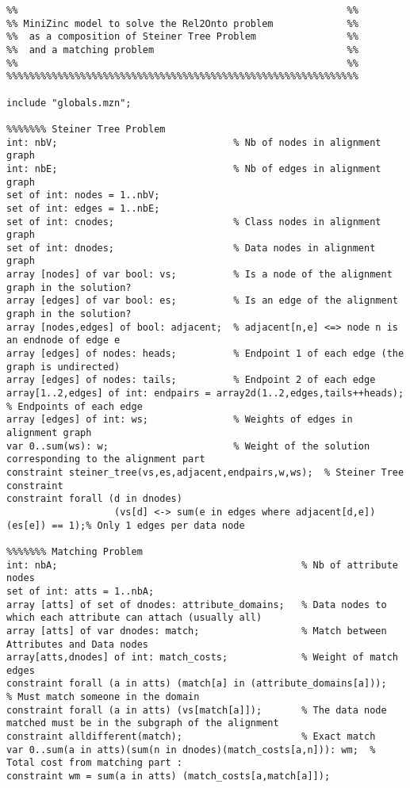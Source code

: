 \documentclass[letterpaper]{article} %
\newcommand{\minizinc}{\textsc{MiniZinc}}
\begin{document}
\begin{minipage}{\textwidth}
	\begin{lstlisting}[caption={\minizinc{} model (part 1 of 2)},captionpos=b]
%%%%%%%%%%%%%%%%%%%%%%%%%%%%%%%%%%%%%%%%%%%%%%%%%%%%%%%%%%%%%%
%%                                                          %%
%% MiniZinc model to solve the Rel2Onto problem             %%
%%  as a composition of Steiner Tree Problem                %%
%%  and a matching problem                                  %%
%%                                                          %%
%%%%%%%%%%%%%%%%%%%%%%%%%%%%%%%%%%%%%%%%%%%%%%%%%%%%%%%%%%%%%%

include "globals.mzn";

%%%%%%% Steiner Tree Problem
int: nbV;                               % Nb of nodes in alignment graph
int: nbE;                               % Nb of edges in alignment graph
set of int: nodes = 1..nbV;    
set of int: edges = 1..nbE;
set of int: cnodes;                     % Class nodes in alignment graph
set of int: dnodes;                     % Data nodes in alignment graph
array [nodes] of var bool: vs;          % Is a node of the alignment graph in the solution?
array [edges] of var bool: es;          % Is an edge of the alignment graph in the solution?
array [nodes,edges] of bool: adjacent;  % adjacent[n,e] <=> node n is an endnode of edge e
array [edges] of nodes: heads;          % Endpoint 1 of each edge (the graph is undirected)
array [edges] of nodes: tails;          % Endpoint 2 of each edge
array[1..2,edges] of int: endpairs = array2d(1..2,edges,tails++heads);  % Endpoints of each edge
array [edges] of int: ws;               % Weights of edges in alignment graph
var 0..sum(ws): w;                      % Weight of the solution corresponding to the alignment part
constraint steiner_tree(vs,es,adjacent,endpairs,w,ws);  % Steiner Tree constraint
constraint forall (d in dnodes) 
                   (vs[d] <-> sum(e in edges where adjacent[d,e])(es[e]) == 1);% Only 1 edges per data node 

%%%%%%% Matching Problem
int: nbA;                                           % Nb of attribute nodes
set of int: atts = 1..nbA;                 
array [atts] of set of dnodes: attribute_domains;   % Data nodes to which each attribute can attach (usually all) 
array [atts] of var dnodes: match;                  % Match between Attributes and Data nodes
array[atts,dnodes] of int: match_costs;             % Weight of match edges
constraint forall (a in atts) (match[a] in (attribute_domains[a]));   % Must match someone in the domain
constraint forall (a in atts) (vs[match[a]]);       % The data node matched must be in the subgraph of the alignment
constraint alldifferent(match);                     % Exact match
var 0..sum(a in atts)(sum(n in dnodes)(match_costs[a,n])): wm;  % Total cost from matching part :
constraint wm = sum(a in atts) (match_costs[a,match[a]]);

	\end{lstlisting}
\end{minipage}
\end{document}
